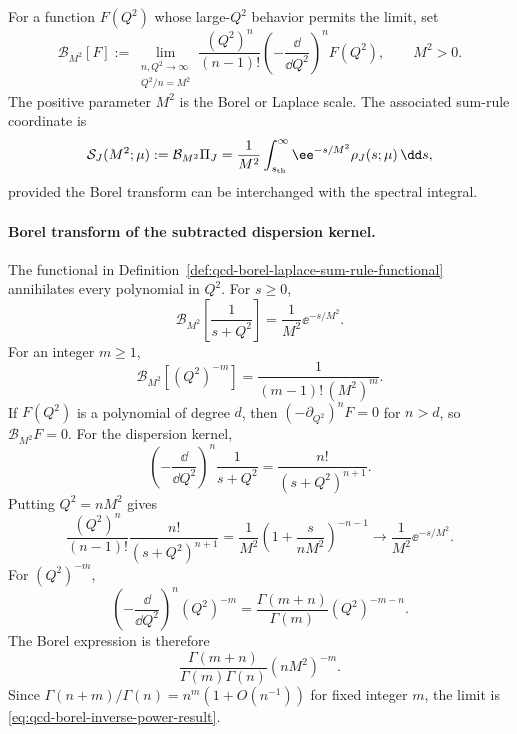 \begin{definition}
\label{def:qcd-borel-laplace-sum-rule-functional}
For a function \(F(Q^2)\) whose large-\(Q^2\) behavior permits the limit, set
\begin{equation}
  \mathcal B_{M^2}[F]
  :=
  \lim_{\substack{n,Q^2\to\infty\\ Q^2/n=M^2}}
  \frac{(Q^2)^n}{(n-1)!}
  \left(-\frac{\dd}{\dd Q^2}\right)^n F(Q^2),
  \qquad M^2>0 .
  \label{eq:qcd-borel-transform-definition}
\end{equation}
The positive parameter \(M^2\) is the Borel or Laplace scale.  The associated
sum-rule coordinate is
\begin{equation}
  \mathcal S_J(M^2;\mu)
  :=
  \mathcal B_{M^2}\Pi_J
  =
  \frac1{M^2}\int_{s_{\rm th}}^\infty
  \ee^{-s/M^2}\rho_J(s;\mu)\,\dd s ,
  \label{eq:qcd-borel-spectral-coordinate}
\end{equation}
provided the Borel transform can be interchanged with the spectral integral.
\end{definition}

\paragraph{Borel transform of the subtracted dispersion kernel.}
The functional in Definition~\ref{def:qcd-borel-laplace-sum-rule-functional}
annihilates every polynomial in \(Q^2\).  For \(s\ge0\),
\begin{equation}
  \mathcal B_{M^2}\!\left[\frac1{s+Q^2}\right]
  =
  \frac1{M^2}\ee^{-s/M^2}.
  \label{eq:qcd-borel-kernel-result}
\end{equation}
For an integer \(m\ge1\),
\begin{equation}
  \mathcal B_{M^2}\!\left[(Q^2)^{-m}\right]
  =
  \frac{1}{(m-1)!\,(M^2)^m}.
  \label{eq:qcd-borel-inverse-power-result}
\end{equation}
If \(F(Q^2)\) is a polynomial of degree \(d\), then
\((-\partial_{Q^2})^nF=0\) for \(n>d\), so
\(\mathcal B_{M^2}F=0\).  For the dispersion kernel,
\[
  \left(-\frac{\dd}{\dd Q^2}\right)^n\frac1{s+Q^2}
  =
  \frac{n!}{(s+Q^2)^{n+1}}.
\]
Putting \(Q^2=nM^2\) gives
\[
  \frac{(Q^2)^n}{(n-1)!}
  \frac{n!}{(s+Q^2)^{n+1}}
  =
  \frac1{M^2}
  \left(1+\frac{s}{nM^2}\right)^{-n-1}
  \longrightarrow
  \frac1{M^2}\ee^{-s/M^2}.
\]
For \((Q^2)^{-m}\),
\[
  \left(-\frac{\dd}{\dd Q^2}\right)^n(Q^2)^{-m}
  =
  \frac{\Gamma(m+n)}{\Gamma(m)}(Q^2)^{-m-n}.
\]
The Borel expression is therefore
\[
  \frac{\Gamma(m+n)}{\Gamma(m)\Gamma(n)}
  (nM^2)^{-m}.
\]
Since \(\Gamma(n+m)/\Gamma(n)=n^m(1+O(n^{-1}))\) for fixed integer \(m\), the
limit is \eqref{eq:qcd-borel-inverse-power-result}.

